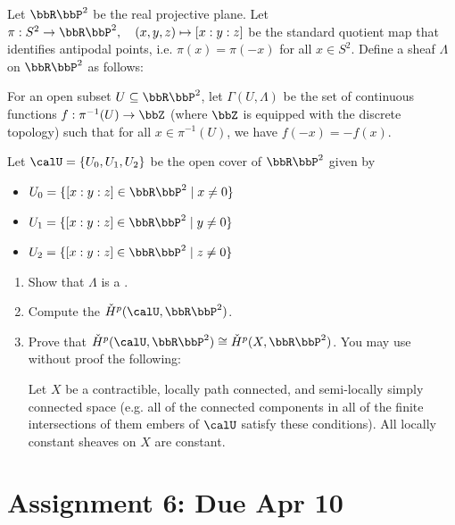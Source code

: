 \begin{problem}
    Let $\bbR\bbP^2$ be the real projective plane. Let $\pi: S^2 \to \bbR\bbP^2, \quad (x,y,z) \mapsto [x:y:z]$ be the standard quotient map that identifies antipodal points, i.e. $\pi(x) = \pi(-x)$ for all $x \in S^2$. Define a sheaf $\Lambda$ on $\bbR\bbP^2$ as follows:
    \begin{center}
        For an open subset $U \subseteq \bbR\bbP^2$, let $\Gamma(U, \Lambda)$ be the set of continuous functions $f: \pi^{-1}(U) \to \bbZ$ (where $\bbZ$ is equipped with the discrete topology) such that for all $x \in \pi^{-1}(U)$, we have $f(-x) = -f(x)$. 
    \end{center}
    Let $\calU = \{U_0, U_1, U_2\}$ be the open cover of $\bbR\bbP^2$ given by 
    \begin{itemize}
        \item $U_0 = \{ [x:y:z] \in \bbR\bbP^2 \mid x \neq 0 \}$
        \item $U_1 = \{ [x:y:z] \in \bbR\bbP^2 \mid y \neq 0 \}$
        \item $U_2 = \{ [x:y:z] \in \bbR\bbP^2 \mid z \neq 0 \}$
    \end{itemize}
    \begin{enumerate}
        \item Show that $\Lambda$ is a .

        \item Compute the  $\check{H}^p(\calU, \bbR\bbP^2)$.

        \item Prove that $\check{H}^p(\calU, \bbR\bbP^2) \cong \check{H}^p(X, \bbR\bbP^2)$. You may use without proof the following:
        \begin{center}
            Let $X$ be a contractible, locally path connected, and semi-locally simply connected space (e.g. all of the connected components in all of the finite intersections of them embers of $\calU$ satisfy these conditions). All locally constant sheaves on $X$ are constant. 
        \end{center}
    \end{enumerate}
\end{problem}

\section{Assignment 6: Due Apr 10}


